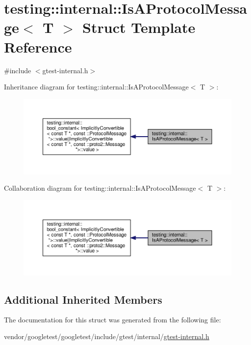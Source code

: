 \hypertarget{structtesting_1_1internal_1_1_is_a_protocol_message}{}\section{testing\+:\+:internal\+:\+:Is\+A\+Protocol\+Message$<$ T $>$ Struct Template Reference}
\label{structtesting_1_1internal_1_1_is_a_protocol_message}


{\ttfamily \#include $<$gtest-\/internal.\+h$>$}



Inheritance diagram for testing\+:\+:internal\+:\+:Is\+A\+Protocol\+Message$<$ T $>$\+:
\nopagebreak
\begin{figure}[H]
\begin{center}
\leavevmode
\includegraphics[width=350pt]{structtesting_1_1internal_1_1_is_a_protocol_message__inherit__graph}
\end{center}
\end{figure}


Collaboration diagram for testing\+:\+:internal\+:\+:Is\+A\+Protocol\+Message$<$ T $>$\+:
\nopagebreak
\begin{figure}[H]
\begin{center}
\leavevmode
\includegraphics[width=350pt]{structtesting_1_1internal_1_1_is_a_protocol_message__coll__graph}
\end{center}
\end{figure}
\subsection*{Additional Inherited Members}


The documentation for this struct was generated from the following file\+:\begin{DoxyCompactItemize}
\item 
vendor/googletest/googletest/include/gtest/internal/\hyperlink{gtest-internal_8h}{gtest-\/internal.\+h}\end{DoxyCompactItemize}
